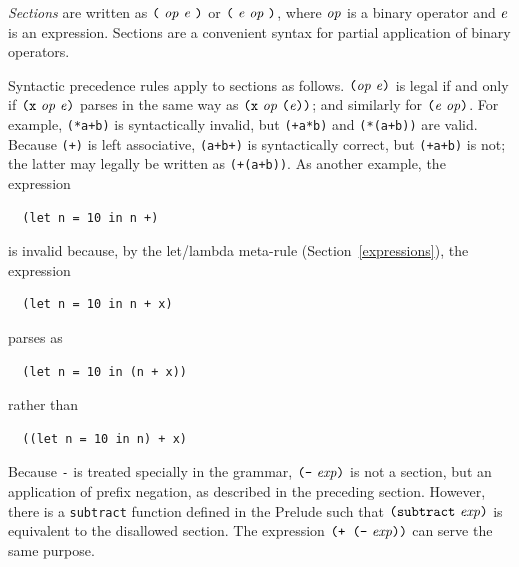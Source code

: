 \noindent
{\em Sections} are written as \mbox{$\it \makebox{\tt (}\ op\ e\ \makebox{\tt )}$} or \mbox{$\it \makebox{\tt (}\ e\ op\ \makebox{\tt )}$}, where
\mbox{$\it op$} is a binary operator and \mbox{$\it e$} is an expression.  Sections are a
convenient syntax for partial application of binary operators.

Syntactic precedence rules apply to sections as follows.
\mbox{$\it \makebox{\tt (}op~e\makebox{\tt )}$} is legal if and only if \mbox{$\it \makebox{\tt (x}~op~e\makebox{\tt )}$} parses 
in the same way as \mbox{$\it \makebox{\tt (x}~op~\makebox{\tt (}e\makebox{\tt ))}$};
and similarly for  \mbox{$\it \makebox{\tt (}e~op\makebox{\tt )}$}.
For example, \mbox{\tt (*a+b)} is syntactically invalid, but \mbox{\tt (+a*b)} and
\mbox{\tt (*(a+b))} are valid.  Because \mbox{\tt (+)} is left associative, \mbox{\tt (a+b+)} is syntactically correct,
but \mbox{\tt (+a+b)} is not; the latter may legally be written as \mbox{\tt (+(a+b))}.
As another example, the expression
\bprog
{\small\begin{verbatim}
  (let n = 10 in n +)
\end{verbatim}}
\eprog
is invalid because, by the let/lambda meta-rule (Section~\ref{expressions}),
the expression
\bprog
{\small\begin{verbatim}
  (let n = 10 in n + x)
\end{verbatim}}
\eprog
parses as
\bprog
{\small\begin{verbatim}
  (let n = 10 in (n + x))
\end{verbatim}}
\eprog
rather than
\bprog
{\small\begin{verbatim}
  ((let n = 10 in n) + x)
\end{verbatim}}
\eprog

Because \mbox{\tt -} is treated specially in the grammar,
\mbox{$\it \makebox{\tt (-}\ exp\makebox{\tt )}$} is not a section, but an application of prefix
negation, as
described in the preceding section.  However, there is a \mbox{\tt subtract}
function defined in the Prelude such that
\mbox{$\it \makebox{\tt (subtract}\ exp\makebox{\tt )}$} is equivalent to the disallowed section.
The expression \mbox{$\it \makebox{\tt (+\ (-}\ exp\makebox{\tt ))}$} can serve the same purpose.




